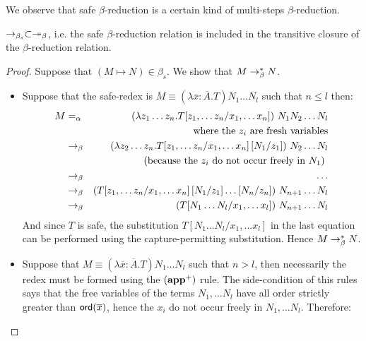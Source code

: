 We observe that safe $\beta$-reduction is a certain kind of multi-steps $\beta$-reduction.
\begin{property}
$\rightarrow_{\beta_s} \subset \twoheadrightarrow_\beta$, i.e. the safe
$\beta$-reduction relation is included in the transitive closure of the $\beta$-reduction relation.
\end{property}
\begin{proof}
Suppose that $(M\mapsto N) \in \beta_s$. We show that $M \rightarrow_\beta^* N$.
\begin{itemize}
\item Suppose that the safe-redex is
$M \equiv (\lambda \overline{x} : \overline{A} . T) N_1 \ldots N_l$ such that $n\leq l$ then:
\begin{eqnarray*}
 M &=_\alpha& (\lambda z_1 \ldots z_n .T [z_1,\ldots z_n /x_1,\ldots x_n] ) \ N_1  N_2 \ldots N_l
            \\
&& \mbox{where the $z_i$ are fresh variables}  \\
     &\rightarrow_\beta& (\lambda z_2 \ldots z_n .T [z_1,\ldots z_n /x_1,\ldots x_n] \left[ N_1/z_1 \right] ) \ N_2 \ldots N_l \\
&& \mbox{ (because the $z_i$ do not occur freely in $N_1$) }\\
    &\rightarrow_\beta& \ldots \\
    &\rightarrow_\beta& (T [z_1,\ldots z_n /x_1,\ldots x_n] \left[ N_1/z_1 \right]  \ldots \left[ N_n/z_n \right])\  N_{n+1} \ldots N_l \\
    &\rightarrow_\beta& (T [N_1\ldots N_l/x_1,\ldots x_l])\ N_{n+1} \ldots N_l
\end{eqnarray*}
And since $T$ is safe, the substitution $T [N_1\ldots N_l/x_1,\ldots x_l]$ in the last equation
can be performed using the capture-permitting substitution. Hence $M \rightarrow_\beta^* N$.

\item
 Suppose that $M \equiv (\lambda \overline{x} : \overline{A} . T) N_1 \ldots N_l$ such that $n> l$, then necessarily
the redex must be formed using the $\mathbf{(app^+)}$ rule. The side-condition of this rules
says that the free variables of the terms $N_1, \ldots N_l$ have all order strictly greater than ${\sf ord}(\overline{x})$,
hence the $x_i$ do not occur freely in $N_1, \ldots N_l$. Therefore:


\end{itemize}
\end{proof}

